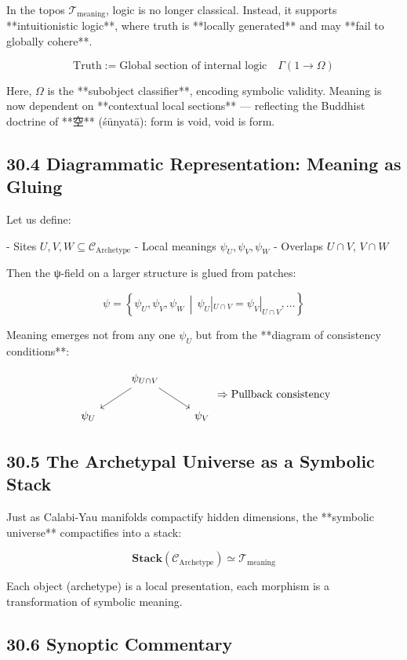 \documentclass[12pt]{article}
\begin{document}
\begin{enumerate}
In the topos $\mathcal{T}_{\text{meaning}}$, logic is no longer classical.  
Instead, it supports **intuitionistic logic**, where truth is **locally generated** and may **fail to globally cohere**.

\[
\text{Truth} := \text{Global section of internal logic} \quad \Gamma(1 \to \Omega)
\]

Here, $\Omega$ is the **subobject classifier**, encoding symbolic validity.  
Meaning is now dependent on **contextual local sections** — reflecting the Buddhist doctrine of **空** (śūnyatā): form is void, void is form.

\subsection*{30.4 Diagrammatic Representation: Meaning as Gluing}

Let us define:

- Sites $U, V, W \subseteq \mathcal{C}_{\text{Archetype}}$
- Local meanings $\psi_U, \psi_V, \psi_W$
- Overlaps $U \cap V$, $V \cap W$

Then the ψ-field on a larger structure is glued from patches:

\[
\psi = \left\{ \psi_U, \psi_V, \psi_W \,\middle|\, \psi_U|_{U \cap V} = \psi_V|_{U \cap V}, \dots \right\}
\]

Meaning emerges not from any one $\psi_U$ but from the **diagram of consistency conditions**:

\[
\begin{tikzcd}
& \psi_{U \cap V} \arrow[dl] \arrow[dr] & \\
\psi_U & & \psi_V
\end{tikzcd}
\Rightarrow \text{Pullback consistency}
\]

\subsection*{30.5 The Archetypal Universe as a Symbolic Stack}

Just as Calabi-Yau manifolds compactify hidden dimensions,  
the **symbolic universe** compactifies into a stack:

\[
\textbf{Stack}(\mathcal{C}_{\text{Archetype}}) \simeq \mathcal{T}_{\text{meaning}}
\]

Each object (archetype) is a local presentation,  
each morphism is a transformation of symbolic meaning.

\subsection*{30.6 Synoptic Commentary}


\end{enumerate}
\end{document}
